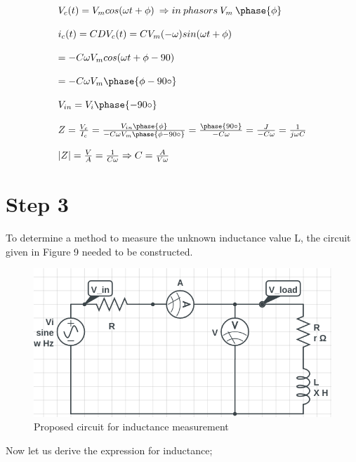 \documentclass[letterpaper,12pt]{article}
\begin{document}
\begin{align*}
    \begin{array}{l}
        V_c(t) = V_m cos(\omega t+ \phi )  \: \Rightarrow  in \: phasors \:  V_m \: \phase {\phi} \\ \\
        i_c(t) = CDV_c(t) = CV_m(-\omega) sin(\omega t + \phi) \\ \\
       = -C\omega V_m cos(\omega t + \phi -90) \\ \\
       =-C\omega V_m \phase {\phi - 90\circ} \\ \\
       V_{in} = V_i  \phase{-90\circ} \\ \\
       Z = \frac{V_c}{I_c} = \frac{V_{in} \phase{\phi}}{ - C \omega V_m \phase{\phi -90 \circ}} = \frac{\phase{90\circ}}{-C\omega} = \frac{J}{-C\omega}  = \frac{1}{j\omega C} \\
       \\
       |Z| = \frac{V}{A} =  \frac{1}{C\omega} \Rightarrow C = \frac{A}{V\omega}
    \end{array}
\end{align*}

\section{Step 3}
To determine a method to measure the unknown inductance value L, the circuit given in Figure 9 needed to be constructed.
\begin{figure}[H]
    \centering
    \includegraphics[width=1\textwidth]{3SCH.png}
\caption{Proposed circuit for inductance measurement}
\end{figure} 
Now let us derive the expression for inductance;
\end{document}
